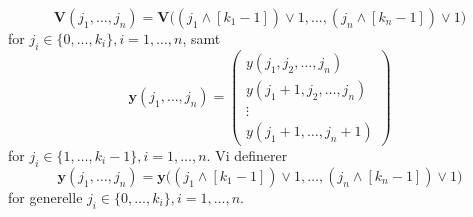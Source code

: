 \documentclass[a4paper, 12pt]{memoir}
\begin{document}
\begin{equation}
\mathbf{V}({j_1, \dots, j_n})=\mathbf{V}\bigl((j_1 \wedge [k_1-1])\vee 1, \dots, (j_n \wedge [k_n-1])\vee 1\bigr)
\end{equation}
for $ j_i\in \{0, \dots, k_i\}, i=1, \dots, n$, samt
\begin{equation}
\mathbf{y}(j_1, \dots, j_n)=\begin{pmatrix}
y(j_1,j_2, \dots, j_n)\\
y(j_1+1, j_2,\dots, j_n)\\
\vdots\\
y(j_1+1, \dots, j_n+1)
\end{pmatrix}
\end{equation}
for $j_i \in \{1,\dots, k_i-1\}, i=1, \dots, n$. Vi definerer
\begin{equation}
\mathbf y(j_1, \dots, j_n)=\mathbf y \bigl((j_1 \wedge [k_1-1])\vee 1, \dots, (j_n \wedge [k_n-1])\vee 1\bigr)
\end{equation}
for generelle $j_i \in \{0,\dots, k_i\}, i=1, \dots, n$.
\end{document}

